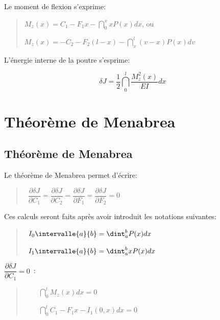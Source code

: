 \medskip
Le moment de flexion s'exprime:

\begin{quotation}
$M_z(x)=C_1-F_1x-\dint_0^x x P(x)dx$, ou

$M_z(x)=-C_2-F_2(l-x)-\dint_x^l(v-x) P(x)dv$
\end{quotation}

\medskip
L'énergie interne de la poutre s'esprime:

\[
\delta J=\frac 12\dint_0^l\dfrac{M_z^2(x)}{EI}dx
\]

\medskip
\ifVersionAvecExemplesSepares
  \section{Théorème de Menabrea}
\else
  \subsection{Théorème de Menabrea}
\fi

Le théorème de Menabrea permet d'écrire:

\begin{quotation}
 ~$\dfrac{\partial \delta J}{\partial C_1} =
  \dfrac{\partial \delta J}{\partial C_2} =
  \dfrac{\partial \delta J}{\partial F_1} =
  \dfrac{\partial \delta J}{\partial F_2} = 0$
\end{quotation}

Ces calculs seront faits après avoir introduit les notations suivantes:
\begin{quotation}
 ~$I_0\intervalle{a}{b}=\dint_a^b P(x)dx$

 ~$I_1\intervalle{a}{b}=\dint_a^b x P(x)dx$
\end{quotation}


$\dfrac{\partial \delta J}{\partial C_1}=0$~:

\begin{quotation}
$\qquad \dint_0^lM_z(x)dx=0$

$\qquad \dint_0^lC_1-F_1x-I_1(0,x)dx=0$
\end{quotation}

